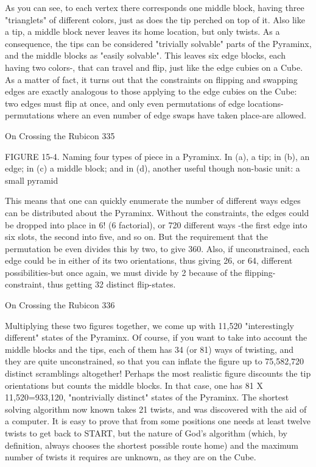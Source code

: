 As you can see, to each vertex there corresponds one middle block, having three
"trianglets" of different colors, just as does the tip perched on top of it. Also like a tip,
a middle block never leaves its home location, but only twists. As a consequence, the
tips can be considered "trivially solvable" parts of the Pyraminx, and the middle
blocks as "easily solvable".
        This leaves six edge blocks, each having two colors-, that can travel and flip,
just like the edge cubies on a Cube. As a matter of fact, it turns out that the constraints
on flipping and swapping edges are exactly analogous to those applying to the edge
cubies on the Cube: two edges must flip at once, and only even permutations of edge
locations-permutations where an even number of edge swaps have taken place-are
allowed.




On Crossing the Rubicon                                                                 335

FIGURE 15-4. Naming four types of piece in a Pyraminx. In (a), a tip; in (b), an
edge; in (c) a middle block; and in (d), another useful though non-basic unit: a small
pyramid

        This means that one can quickly enumerate the number of different ways
edges can be distributed about the Pyraminx. Without the constraints, the edges could
be dropped into place in 6! (6 factorial), or 720 different ways -the first edge into six
slots, the second into five, and so on. But the requirement that the permutation be
even divides this by two, to give 360. Also, if unconstrained, each edge could be in
either of its two orientations, thus giving 26, or 64, different possibilities-but once
again, we must divide by 2 because of the flipping-constraint, thus getting 32 distinct
flip-states.




On Crossing the Rubicon                                                              336

Multiplying these two figures together, we come up with 11,520 "interestingly
different" states of the Pyraminx. Of course, if you want to take into account the
middle blocks and the tips, each of them has 34 (or 81) ways of twisting, and they are
quite unconstrained, so that you can inflate the figure up to 75,582,720 distinct
scramblings altogether! Perhaps the most realistic figure discounts the tip orientations
but counts the middle blocks. In that case, one has 81 X 11,520=933,120,
"nontrivially distinct" states of the Pyraminx.
        The shortest solving algorithm now known takes 21 twists, and was
discovered with the aid of a computer. It is easy to prove that from some positions one
needs at least twelve twists to get back to START, but the nature of God's algorithm
(which, by definition, always chooses the shortest possible route home) and the
maximum number of twists it requires are unknown, as they are on the Cube.

